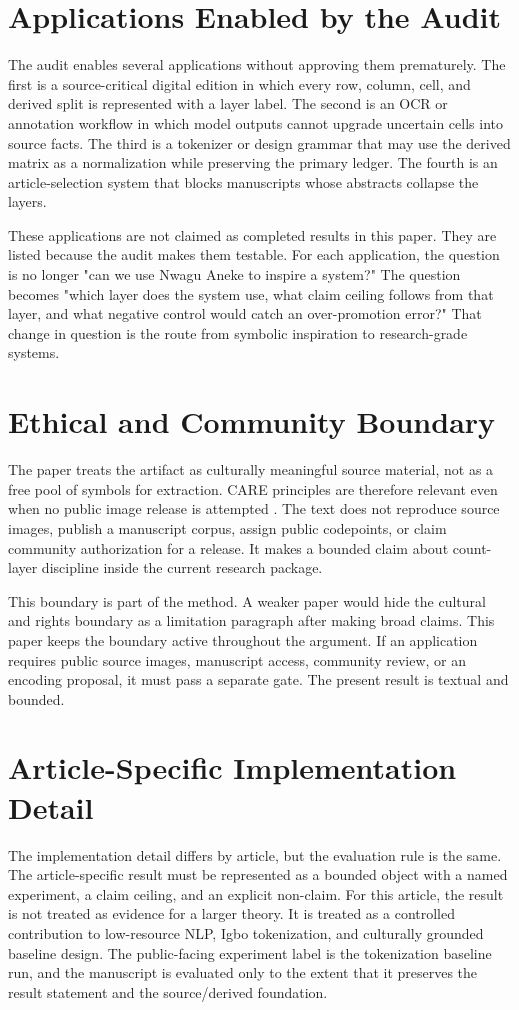 \documentclass[sigconf,nonacm]{acmart}
\begin{document}
\section{Applications Enabled by the Audit}
The audit enables several applications without approving them prematurely. The
first is a source-critical digital edition in which every row, column, cell, and
derived split is represented with a layer label. The second is an OCR or
annotation workflow in which model outputs cannot upgrade uncertain cells into
source facts. The third is a tokenizer or design grammar that may use the
derived matrix as a normalization while preserving the primary ledger. The
fourth is an article-selection system that blocks manuscripts whose abstracts
collapse the layers.

These applications are not claimed as completed results in this paper. They are
listed because the audit makes them testable. For each application, the question
is no longer "can we use Nwagu Aneke to inspire a system?" The question becomes
"which layer does the system use, what claim ceiling follows from that layer,
and what negative control would catch an over-promotion error?" That change in
question is the route from symbolic inspiration to research-grade systems.

\section{Ethical and Community Boundary}
The paper treats the artifact as culturally meaningful source material, not as a
free pool of symbols for extraction. CARE principles are therefore relevant even
when no public image release is attempted \cite{carroll2020care}. The text
does not reproduce source images, publish a manuscript corpus, assign public
codepoints, or claim community authorization for a release. It makes a bounded
claim about count-layer discipline inside the current research package.

This boundary is part of the method. A weaker paper would hide the cultural and
rights boundary as a limitation paragraph after making broad claims. This paper
keeps the boundary active throughout the argument. If an application requires
public source images, manuscript access, community review, or an encoding
proposal, it must pass a separate gate. The present result is textual and
bounded.


\section{Article-Specific Implementation Detail}
The implementation detail differs by article, but the evaluation rule is the same.
The article-specific result must be represented as a bounded object with a named
experiment, a claim ceiling, and an explicit non-claim. For this article, the
result is not treated as evidence for a larger theory. It is treated as a
controlled contribution to low-resource NLP, Igbo tokenization, and culturally grounded baseline design. The public-facing experiment label is the tokenization baseline run, and the manuscript is evaluated only to the extent that it preserves the result
statement and the source/derived foundation.
\end{document}
